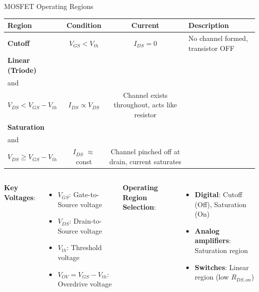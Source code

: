 \documentclass[10pt, aspectratio=169]{beamer}
\begin{document}
\begin{frame}{MOSFET Operating Regions}

    \vspace{-0.5cm}
    
    \begin{center}
    \begin{tabular}{|l|c|c|p{5cm}|}
    \hline
    \textbf{Region} & \textbf{Condition} & \textbf{Current} & \textbf{Description} \\
    \hline
    \hline
    \textbf{Cutoff} & $V_{GS} < V_{th}$ & $I_{DS} = 0$ & No channel formed, transistor OFF \\
    \hline
    \textbf{Linear (Triode)} & \shortstack{$V_{GS} > V_{th}$ \\ and \\ $V_{DS} < V_{GS} - V_{th}$} & $I_{DS} \propto V_{DS}$ & Channel exists throughout, acts like resistor \\
    \hline
    \textbf{Saturation} & \shortstack{$V_{GS} > V_{th}$ \\ and \\ $V_{DS} \geq V_{GS} - V_{th}$} & $I_{DS}$ $\approx$ const & Channel pinched off at drain, current saturates \\
    \hline
    \end{tabular}
    \end{center}
    
    \begin{columns}[t]
        \textbf{Key Voltages}:
        \begin{itemize}
            \item $V_{GS}$: Gate-to-Source voltage
            \item $V_{DS}$: Drain-to-Source voltage
            \item $V_{th}$: Threshold voltage
            \item $V_{OV} = V_{GS} - V_{th}$: Overdrive voltage
        \end{itemize}
        
        \textbf{Operating Region Selection}:
        \begin{itemize}
            \item \textbf{Digital}: Cutoff (Off), Saturation (On)
            \item \textbf{Analog amplifiers}: Saturation region
            \item \textbf{Switches}: Linear region (low $R_{DS,on}$)
        \end{itemize}
        
    \end{columns}
    
\end{frame}
\end{document}
